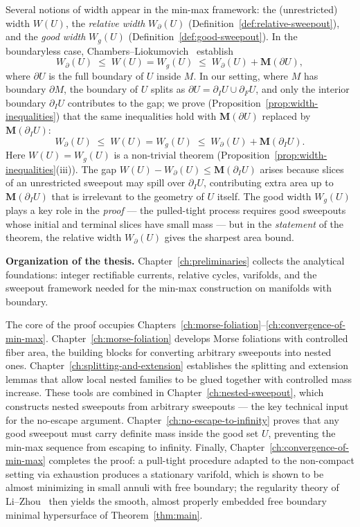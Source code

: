 \begin{remark}\label{rem:why-relative-width}
Several notions of width appear in the min-max framework: the (unrestricted) width $W(U)$, the \emph{relative width} $W_\partial(U)$ (Definition~\ref{def:relative-sweepout}), and the \emph{good width} $W_g(U)$ (Definition~\ref{def:good-sweepout}). In the boundaryless case, Chambers--Liokumovich~\cite{CL20} establish
\[
W_\partial(U) \;\leq\; W(U) = W_g(U) \;\leq\; W_\partial(U) + \mathbf{M}(\partial U),
\]
where $\partial U$ is the full boundary of $U$ inside $M$. In our setting, where $M$ has boundary $\partial M$, the boundary of $U$ splits as $\partial U = \partial_I U \cup \partial_F U$, and only the interior boundary $\partial_I U$ contributes to the gap; we prove (Proposition~\ref{prop:width-inequalities}) that the same inequalities hold with $\mathbf{M}(\partial U)$ replaced by $\mathbf{M}(\partial_I U)$:
\[
W_\partial(U) \;\leq\; W(U) = W_g(U) \;\leq\; W_\partial(U) + \mathbf{M}(\partial_I U).
\]
Here $W(U) = W_g(U)$ is a non-trivial theorem (Proposition~\ref{prop:width-inequalities}(iii)). The gap $W(U) - W_\partial(U) \leq \mathbf{M}(\partial_I U)$ arises because slices of an unrestricted sweepout may spill over $\partial_I U$, contributing extra area up to $\mathbf{M}(\partial_I U)$ that is irrelevant to the geometry of $U$ itself. The good width $W_g(U)$ plays a key role in the \emph{proof} --- the pulled-tight process requires good sweepouts whose initial and terminal slices have small mass --- but in the \emph{statement} of the theorem, the relative width $W_\partial(U)$ gives the sharpest area bound.
\end{remark}

\medskip
\noindent\textbf{Organization of the thesis.}
Chapter~\ref{ch:preliminaries} collects the analytical foundations: integer rectifiable currents, relative cycles, varifolds, and the sweepout framework needed for the min-max construction on manifolds with boundary.

The core of the proof occupies Chapters~\ref{ch:morse-foliation}--\ref{ch:convergence-of-min-max}. Chapter~\ref{ch:morse-foliation} develops Morse foliations with controlled fiber area, the building blocks for converting arbitrary sweepouts into nested ones. Chapter~\ref{ch:splitting-and-extension} establishes the splitting and extension lemmas that allow local nested families to be glued together with controlled mass increase. These tools are combined in Chapter~\ref{ch:nested-sweepout}, which constructs nested sweepouts from arbitrary sweepouts --- the key technical input for the no-escape argument. Chapter~\ref{ch:no-escape-to-infinity} proves that any good sweepout must carry definite mass inside the good set $U$, preventing the min-max sequence from escaping to infinity. Finally, Chapter~\ref{ch:convergence-of-min-max} completes the proof: a pull-tight procedure adapted to the non-compact setting via exhaustion produces a stationary varifold, which is shown to be almost minimizing in small annuli with free boundary; the regularity theory of Li--Zhou~\cite{LZ17} then yields the smooth, almost properly embedded free boundary minimal hypersurface of Theorem~\ref{thm:main}.